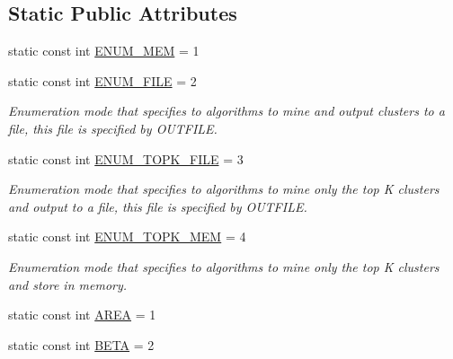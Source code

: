 \subsection*{Static Public Attributes}
\begin{DoxyCompactItemize}
\item 
static const int \hyperlink{class_lattice_algos_a80df6360d3246d74ae31e51e6c4bfa0e}{ENUM\_\-MEM} = 1
\item 
\hypertarget{class_lattice_algos_a824804a33640782553f2b399b28fde13}{
static const int \hyperlink{class_lattice_algos_a824804a33640782553f2b399b28fde13}{ENUM\_\-FILE} = 2}
\label{class_lattice_algos_a824804a33640782553f2b399b28fde13}

\begin{DoxyCompactList}\small\item\em Enumeration mode that specifies to algorithms to mine and output clusters to a file, this file is specified by OUTFILE. \item\end{DoxyCompactList}\item 
\hypertarget{class_lattice_algos_a04a0ea3a71c5b598242fa4ec3d4fce79}{
static const int \hyperlink{class_lattice_algos_a04a0ea3a71c5b598242fa4ec3d4fce79}{ENUM\_\-TOPK\_\-FILE} = 3}
\label{class_lattice_algos_a04a0ea3a71c5b598242fa4ec3d4fce79}

\begin{DoxyCompactList}\small\item\em Enumeration mode that specifies to algorithms to mine only the top K clusters and output to a file, this file is specified by OUTFILE. \item\end{DoxyCompactList}\item 
\hypertarget{class_lattice_algos_a1c6a4b5dce3ccade9e17ce4b2a6afbe7}{
static const int \hyperlink{class_lattice_algos_a1c6a4b5dce3ccade9e17ce4b2a6afbe7}{ENUM\_\-TOPK\_\-MEM} = 4}
\label{class_lattice_algos_a1c6a4b5dce3ccade9e17ce4b2a6afbe7}

\begin{DoxyCompactList}\small\item\em Enumeration mode that specifies to algorithms to mine only the top K clusters and store in memory. \item\end{DoxyCompactList}\item 
static const int \hyperlink{class_lattice_algos_a0a79ddaab00906dea5756ac05a4861a5}{AREA} = 1
\item 
\hypertarget{class_lattice_algos_a3cf765cdc6bce759203597708324ee9e}{
static const int \hyperlink{class_lattice_algos_a3cf765cdc6bce759203597708324ee9e}{BETA} = 2}
\label{class_lattice_algos_a3cf765cdc6bce759203597708324ee9e}


\end{DoxyCompactItemize}
